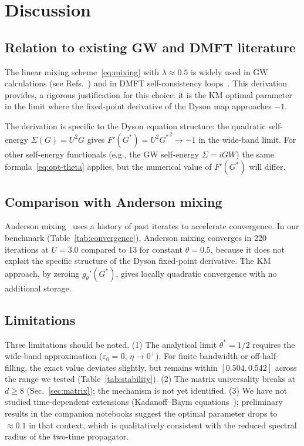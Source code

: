 \documentclass[aps,prb,twocolumn,superscriptaddress,nofootinbib,longbibliography,floatfix]{revtex4-2}
\newcommand{\optparam}{\theta^{*}}
\newcommand{\Gstar}{G^{*}}
\theoremstyle{plain}
\theoremstyle{remark}
\begin{document}
\section{Discussion}
\label{sec:discussion}

\subsection{Relation to existing GW and DMFT literature}

The linear mixing scheme~\eqref{eq:mixing} with $\lambda \approx
0.5$ is widely used in GW calculations (see
Refs.~\cite{Chibani2016, Caruso2013, Aryasetiawan1998}) and in
DMFT self-consistency loops~\cite{Georges1996}.  
This derivation provides, a rigorous justification for this
choice: it is the KM optimal parameter in the limit where the
fixed-point derivative of the Dyson map approaches $-1$.

The derivation is specific to the Dyson equation structure:
the quadratic self-energy $\Sigma(G) = U^2 G$ gives
$F'(\Gstar) = U^2{\Gstar}^2 \to -1$ in the wide-band limit.
For other self-energy functionals (e.g., the GW self-energy
$\Sigma = iGW$) the same formula~\eqref{eq:opt-theta} applies,
but the numerical value of $F'(\Gstar)$ will differ.

\subsection{Comparison with Anderson mixing}

Anderson mixing~\cite{Anderson1965} uses a history of past
iterates to accelerate convergence.  In our benchmark
(Table~\ref{tab:convergence}), Anderson mixing converges in
220 iterations at $U = 3.0$ compared to 13 for constant
$\theta = 0.5$, because it does not exploit the specific
structure of the Dyson fixed-point derivative.  The KM
approach, by zeroing $g_\theta'(\Gstar)$, gives locally
quadratic convergence with no additional storage.

\subsection{Limitations}

Three limitations should be noted.
(1) The analytical limit $\optparam = 1/2$ requires the
wide-band approximation ($\varepsilon_0 = 0$, $\eta \to 0^+$).
For finite bandwidth or off-half-filling, the exact value
deviates slightly, but remains within $[0.504, 0.542]$ across
the range we tested (Table~\ref{tab:stability}).
(2) The matrix universality breaks at $d \geq 8$
(Sec.~\ref{sec:matrix}); the mechanism is not yet identified.
(3) We have not studied time-dependent extensions
(Kadanoff--Baym equations~\cite{KadanoffBaym1962}); preliminary
results in the companion notebooks suggest the optimal parameter
drops to $\approx 0.1$ in that context, which is qualitatively
consistent with the reduced spectral radius of the two-time
propagator.
\end{document}

